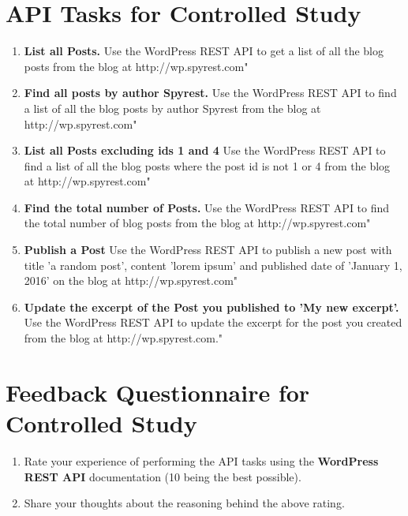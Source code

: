 \chapter{API Tasks for Controlled Study}
\label{chap:appendix_questions}
\begin{enumerate}
  \item \textbf{List all Posts.} Use the WordPress REST API to get a list of all the blog posts from the blog at http://wp.spyrest.com"
  \item \textbf{Find all posts by author Spyrest.} Use the WordPress REST API to find a list of all the blog posts by author Spyrest from the blog at http://wp.spyrest.com"
  \item \textbf{List all Posts excluding ids 1 and 4} Use the WordPress REST API to find a list of all the blog posts where the post id is not 1 or 4 from the blog at http://wp.spyrest.com"
  \item \textbf{Find the total number of Posts.} Use the WordPress REST API to find the total number of blog posts from the blog at http://wp.spyrest.com"
  \item \textbf{Publish a Post} Use the WordPress REST API to publish a new post with title 'a random post', content 'lorem ipsum' and published date of 'January 1, 2016' on the blog at http://wp.spyrest.com"
  \item \textbf{Update the excerpt of the Post you published to 'My new excerpt'.} Use the WordPress REST API to update the excerpt for the post you created from the blog at http://wp.spyrest.com."
\end{enumerate}

\chapter{Feedback Questionnaire for Controlled Study}

\begin{enumerate}
  \item Rate your experience of performing the API tasks using the \textbf{WordPress REST API} documentation (10 being the best possible).
  \item Share your thoughts about the reasoning behind the above rating.
\end{enumerate}

